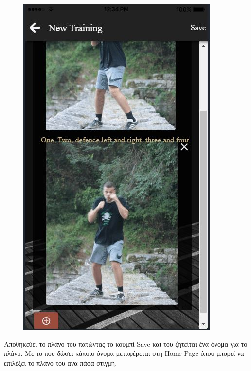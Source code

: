 \documentclass[a4paper,12pt]{article}
\begin{document}
\begin{figure}[!htb]
				\endminipage\hfill
				  \includegraphics[width=\linewidth]{plan4}
				  
				\endminipage
			\end{figure}

			\newpage

			Αποθηκεύει το πλάνο του πατώντας το κουμπί Save και του ζητείται ένα όνομα για το πλάνο. Με το που δώσει 
			κάποιο όνομα μεταφέρεται στη Home Page όπου μπορεί να επιλέξει το πλάνο του ανα πάσα στιγμή.
			\vspace*{1cm}
\end{document}

